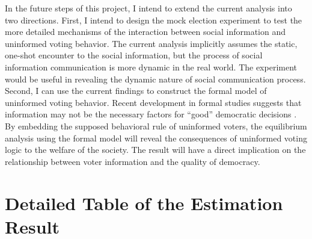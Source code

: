\documentclass[doc,natbib,12pt]{apa6}\usepackage[]{graphicx}\usepackage[]{color}
\begin{document}
    \par In the future steps of this project, I intend to extend the current analysis into two directions. First, I intend to design the mock election experiment to test the more detailed mechanisms of the interaction between social information and uninformed voting behavior. The current analysis implicitly assumes the static, one-shot encounter to the social information, but the process of social information communication is more dynamic in the real world. The experiment would be useful in revealing the dynamic nature of social communication process. Second, I can use the current findings to construct the formal model of uninformed voting behavior. Recent development in formal studies suggests that information may not be the necessary factors for ``good'' democratic decisions \citep{Ashworth2014isvo}. By embedding the supposed behavioral rule of uninformed voters, the equilibrium analysis using the formal model will reveal the consequences of uninformed voting logic to the welfare of the society. The result will have a direct implication on the relationship between voter information and the quality of democracy.
    
    \clearpage
    \singlespacing
    
    
    \clearpage
    \appendix
    \section{Detailed Table of the Estimation Result}
    
    \bigskip
    
    \scriptsize 
\end{document}
